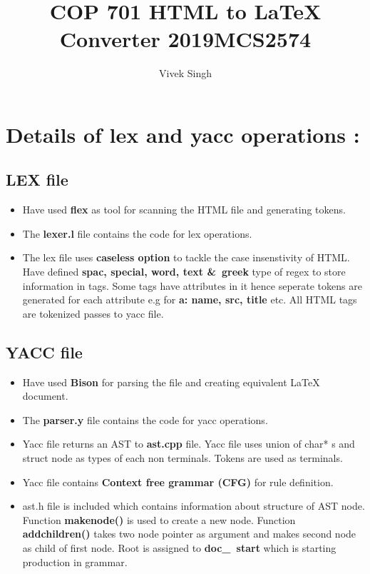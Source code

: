 \documentclass{article}
\title{ COP 701  HTML to LaTeX Converter 2019MCS2574}\author{Vivek Singh}
\begin{document}
\maketitle
\section{ Details of lex and yacc operations : }
\subsection{ LEX file}
\begin{itemize}
\item Have used \textbf{flex} as tool for scanning the HTML file and generating tokens. 
\item The \textbf{ lexer.l } file contains the code for lex operations. 
\item The lex file uses \textbf{caseless option} to tackle the case insenstivity of HTML. Have defined \textbf{spac, special, word, text \&\  greek} type of regex to store information in tags. Some tags have attributes in it hence seperate tokens are generated for each attribute e.g for \textbf{a: name, src, title} etc. All HTML tags are tokenized passes to yacc file.
\end{itemize}
\subsection{ YACC file }
\begin{itemize}
\item Have used \textbf{Bison} for parsing the file and creating equivalent LaTeX document. 
\item The \textbf{ parser.y } file contains the code for yacc operations. 
\item Yacc file returns an AST to \textbf{ ast.cpp } file. Yacc file uses union of char* s and struct node as types of each non terminals. Tokens are used as terminals.
\item Yacc file contains \textbf{Context free grammar (CFG)} for rule definition.
\item ast.h file is included which contains information about structure of AST node. Function \textbf{makenode()} is used to create a new node. Function \textbf{addchildren()} takes two node pointer as argument and makes second node as child of first node. Root is assigned to \textbf{doc\_\ start} which is starting production in grammar. 
\end{itemize}
\end{document}
